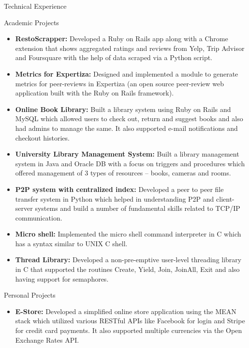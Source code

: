 \documentclass[]{mcdowellcv}
\begin{document}
	\begin{cvsection}{Technical Experience}
		\begin{cvsubsection}{Academic Projects}{}{}
			\begin{itemize}
				\item \textbf{RestoScrapper:} Developed a Ruby on Rails app along with a Chrome extension that shows aggregated ratings and reviews from 						Yelp, Trip Advisor and Foursquare with the help of data scraped via a Python script.
				\item  \textbf{Metrics for Expertiza:} Designed and implemented a module to generate metrics for peer-reviews in Expertiza (an open source peer-review web application built with the Ruby on Rails framework).
				\item  \textbf{Online Book Library:} Built a library system using Ruby on Rails and MySQL which allowed users to check out, return and suggest books and also had admins to manage the same. It also supported e-mail notifications and checkout histories.
				\item  \textbf{University Library Management System:} Built a library management system in Java and Oracle DB with a focus on triggers and procedures which offered management of 3 types of resources – books, cameras and rooms.
				\item  \textbf{P2P system with centralized index:} Developed a peer to peer file transfer system in Python  which helped in understanding P2P and client-server systems and build a number of fundamental skills related to TCP/IP communication.
				\item  \textbf{Micro shell:} Implemented the micro shell command interpreter in C which has a syntax similar to UNIX C shell.
				\item  \textbf{Thread Library:} Developed a non-pre-emptive user-level threading library in C that supported the routines Create, Yield, Join, JoinAll, Exit and also having support for semaphores.
			\end{itemize}
		\end{cvsubsection}
		\begin{cvsubsection}{Personal Projects}{}{}
			\begin{itemize}
				\item  \textbf{E-Store:} Developed a simplified online store application using the MEAN stack which utilized various RESTful APIs like Facebook for login and Stripe for credit card payments. It also supported multiple currencies via the Open Exchange Rates API.
			\end{itemize}
		\end{cvsubsection}
	\end{cvsection}
	
\end{document}
